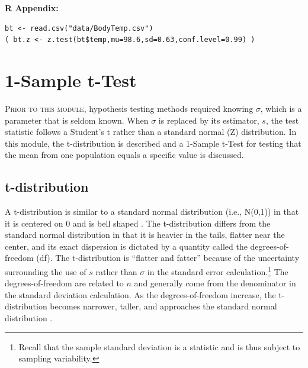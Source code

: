\documentclass[10pt,openany]{book}\usepackage[]{graphicx}\usepackage[]{color}
\makeatletter
\newenvironment{kframe}{%
 \def\at@end@of@kframe{}%
 \ifinner\ifhmode%
  \def\at@end@of@kframe{\end{minipage}}%
  \begin{minipage}{\columnwidth}%
 \fi\fi%
 \def\FrameCommand##1{\hskip\@totalleftmargin \hskip-\fboxsep
 \colorbox{shadecolor}{##1}\hskip-\fboxsep
     \hskip-\linewidth \hskip-\@totalleftmargin \hskip\columnwidth}%
 \MakeFramed {\advance\hsize-\width
   \@totalleftmargin\z@ \linewidth\hsize
   \@setminipage}}%
 {\par\unskip\endMakeFramed%
 \at@end@of@kframe}
\newenvironment{knitrout}{}{} %
\makeatother
\begin{document}
\begin{minipage}{\textwidth}
\textbf{R Appendix:}
\vspace*{-6pt}
\begin{knitrout}
\color{fgcolor}\begin{kframe}
\begin{verbatim}
bt <- read.csv("data/BodyTemp.csv")
( bt.z <- z.test(bt$temp,mu=98.6,sd=0.63,conf.level=0.99) )
\end{verbatim}
\end{kframe}
\end{knitrout}
\end{minipage}



\chapter{1-Sample t-Test} \label{chap:tTest1}

\minitoc
\vspace*{48pt}

\lettrine{P}{rior to this module}, hypothesis testing methods required knowing $\sigma$, which is a parameter that is seldom known. When $\sigma$ is replaced by its estimator, $s$, the test statistic follows a Student's t rather than a standard normal (Z) distribution. In this module, the t-distribution is described and a 1-Sample t-Test for testing that the mean from one population equals a specific value is discussed.

\vspace*{12pt}
\section{t-distribution}\label{sect:tDist}
A t-distribution is similar to a standard normal distribution (i.e., N(0,1)) in that it is centered on 0 and is bell shaped . The t-distribution differs from the standard normal distribution in that it is heavier in the tails, flatter near the center, and its exact dispersion is dictated by a quantity called the degrees-of-freedom (df). The t-distribution is ``flatter and fatter'' because of the uncertainty surrounding the use of $s$ rather than $\sigma$ in the standard error calculation.\footnote{Recall that the sample standard deviation is a statistic and is thus subject to sampling variability.}  The degrees-of-freedom are related to $n$ and generally come from the denominator in the standard deviation calculation. As the degrees-of-freedom increase, the t-distribution becomes narrower, taller, and approaches the standard normal distribution .
\end{document}
